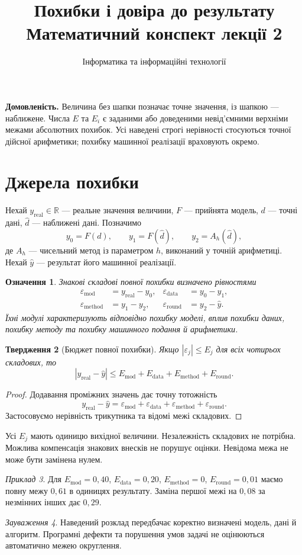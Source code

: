 \documentclass[11pt,a4paper]{article}
\title{\sffamily Похибки і довіра до результату\\[4pt]\large Математичний конспект лекції 2}
\author{Інформатика та інформаційні технології}
\date{}
\newtheorem{definition}{Означення}[section]
\newtheorem{proposition}[definition]{Твердження}
\theoremstyle{remark}
\newtheorem{remark}[definition]{Зауваження}
\newtheorem{example}[definition]{Приклад}
\newcommand{\R}{\mathbb R}
\newcommand{\yh}{\widehat y}
\begin{document}
\maketitle
\vspace{-1.5em}
\textbf{Домовленість.} Величина без шапки позначає точне значення, із шапкою --- наближене. Числа $E$ та $E_i$ є заданими або доведеними невід'ємними верхніми межами абсолютних похибок. Усі наведені строгі нерівності стосуються точної дійсної арифметики; похибку машинної реалізації враховують окремо.

\section{Джерела похибки}
Нехай $y_{\mathrm{real}}\in\R$ --- реальне значення величини, $F$ --- прийнята модель, $d$ --- точні дані, $\widehat d$ --- наближені дані. Позначимо
\[
 y_0=F(d),\qquad y_1=F(\widehat d),\qquad y_2=A_h(\widehat d),
\]
де $A_h$ --- чисельний метод із параметром $h$, виконаний у точній арифметиці. Нехай $\yh$ --- результат його машинної реалізації.
\begin{definition}
Знакові складові повної похибки визначено рівностями
\begin{align*}
 \varepsilon_{\mathrm{mod}}&=y_{\mathrm{real}}-y_0,&
 \varepsilon_{\mathrm{data}}&=y_0-y_1,\\
 \varepsilon_{\mathrm{method}}&=y_1-y_2,&
 \varepsilon_{\mathrm{round}}&=y_2-\yh.
\end{align*}
Їхні модулі характеризують відповідно похибку моделі, вплив похибки даних, похибку методу та похибку машинного подання й арифметики.
\end{definition}
\begin{proposition}[Бюджет повної похибки]
Якщо $|\varepsilon_j|\le E_j$ для всіх чотирьох складових, то
\begin{equation}
 |y_{\mathrm{real}}-\yh|\le E_{\mathrm{mod}}+E_{\mathrm{data}}+E_{\mathrm{method}}+E_{\mathrm{round}}.
\end{equation}
\end{proposition}
\begin{proof}
Додавання проміжних значень дає точну тотожність
\[
 y_{\mathrm{real}}-\yh=\varepsilon_{\mathrm{mod}}+\varepsilon_{\mathrm{data}}+\varepsilon_{\mathrm{method}}+\varepsilon_{\mathrm{round}}.
\]
Застосовуємо нерівність трикутника та відомі межі складових.
\end{proof}
Усі $E_j$ мають одиницю вихідної величини. Незалежність складових не потрібна. Можлива компенсація знакових внесків не порушує оцінки. Невідома межа не може бути замінена нулем.
\begin{example}
Для $E_{\mathrm{mod}}=0{,}40$, $E_{\mathrm{data}}=0{,}20$, $E_{\mathrm{method}}=0$, $E_{\mathrm{round}}=0{,}01$ маємо повну межу $0{,}61$ в одиницях результату. Заміна першої межі на $0{,}08$ за незмінних інших дає $0{,}29$.
\end{example}
\begin{remark}
Наведений розклад передбачає коректно визначені модель, дані й алгоритм. Програмні дефекти та порушення умов задачі не оцінюються автоматично межею округлення.
\end{remark}
\end{document}
